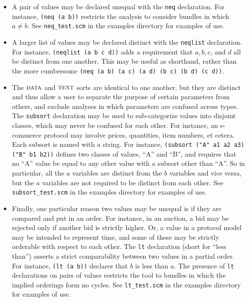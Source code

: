 \begin{itemize}

\item A pair of values may be declared unequal with the \texttt{neq}
  declaration.  For instance, \texttt{(neq (a b))} restricts the
  analysis to consider bundles in which $a \neq b$.  See
  \texttt{neq\_test.scm} in the examples directory for examples of use.

\item A larger list of values may be declared distinct with the
  \texttt{neqlist} declaration.  For instance, \texttt{(neqlist (a b c
    d))} adds a requirement that $a, b, c$, and $d$ all be distinct
  from one another.  This may be useful as shorthand, rather than the more
  cumbersome \texttt{(neq (a b) (a c) (a d) (b c) (b d) (c d))}.

\item The $\scap{data}$ and $\scap{text}$ sorts are identical to one
  another, but they are distinct and thus allow a user to separate the
  purpose of certain parameters from others, and exclude analyses in
  which parameters are confused across types.  The \texttt{subsort}
  declaration may be used to sub-categorize values into disjoint
  classes, which may never be confused for each other.  For instance,
  an e-commerce protocol may involve prices, quantities, item numbers,
  et cetera.  Each subsort is named with a string.  For instance,
  \texttt{(subsort ("A" a1 a2 a3) ("B" b1 b2))} defines two classes of
  values, ``A'' and ``B'', and requires that no ``A'' value be equal
  to any other value with a subsort other than ``A''.  So in
  particular, all the $a$ variables are distinct from the $b$
  variables and vice versa, but the $a$ variables are not required to
  be distinct from each other.  See \texttt{subsort\_test.scm} in the
  examples directory for examples of use.

\item Finally, one particular reason two values may be unequal is if
  they are compared and put in an order.  For instance, in an auction,
  a bid may be rejected only if another bid is strictly higher.  Or, a
  value in a protocol model may be intended to represent time, and
  some of these may be strictly orderable with respect to each other.
  The \texttt{lt} declaration (short for ``less than'') asserts a
  strict comparability between two values in a partial order.  For
  instance, \texttt{(lt (a b))} declares that $b$ is less than $a$.
  The presence of \texttt{lt} declarations on pairs of values
  restricts the tool to bundles in which the implied orderings form no
  cycles.  See \texttt{lt\_test.scm} in the examples directory for
  examples of use.
\end{itemize}

